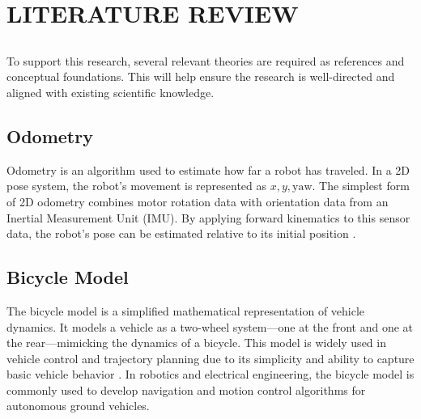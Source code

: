\chapter{LITERATURE REVIEW}

\section*{ }
To support this research, several relevant theories are required as references and conceptual foundations. This will help ensure the research is well-directed and aligned with existing scientific knowledge.
\vspace{1ex}


\section{Odometry}
Odometry is an algorithm used to estimate how far a robot has traveled. In a 2D pose system, the robot’s movement is represented as \(x, y, \text{yaw}\). The simplest form of 2D odometry combines motor rotation data with orientation data from an Inertial Measurement Unit (IMU). By applying forward kinematics to this sensor data, the robot's pose can be estimated relative to its initial position \cite{ref_mas_marin}.

\section{Bicycle Model}
The bicycle model is a simplified mathematical representation of vehicle dynamics. It models a vehicle as a two-wheel system—one at the front and one at the rear—mimicking the dynamics of a bicycle. This model is widely used in vehicle control and trajectory planning due to its simplicity and ability to capture basic vehicle behavior \cite{rajamani2011vehicle}. In robotics and electrical engineering, the bicycle model is commonly used to develop navigation and motion control algorithms for autonomous ground vehicles.

